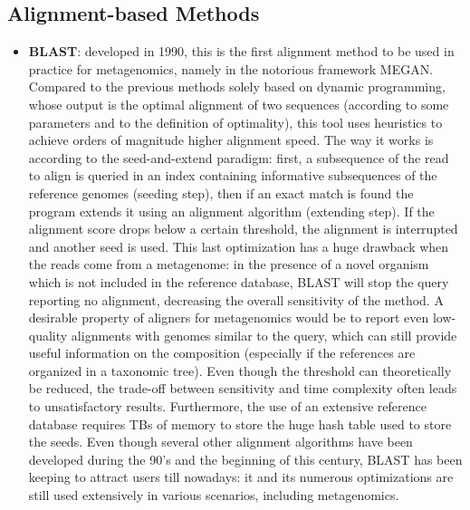\subsection{Alignment-based Methods}
\begin{itemize}
    \item \textbf{BLAST}: developed in 1990, this is the first alignment method to be used in practice for metagenomics, namely in the notorious framework MEGAN. Compared to the previous methods solely based on dynamic programming, whose output is the optimal alignment of two sequences (according to some parameters and to the definition of optimality), this tool uses heuristics to achieve orders of magnitude higher alignment speed. The way it works is according to the seed-and-extend paradigm: first, a subsequence of the read to align is queried in an index containing informative subsequences of the reference genomes (seeding step), then if an exact match is found the program extends it using an alignment algorithm (extending step). If the alignment score drops below a certain threshold, the alignment is interrupted and another seed is used. This last optimization has a huge drawback when the reads come from a metagenome: in the presence of a novel organism which is not included in the reference database, BLAST will stop the query reporting no alignment, decreasing the overall sensitivity of the method. A desirable property of aligners for metagenomics would be to report even low-quality alignments with genomes similar to the query, which can still provide useful information on the composition (especially if the references are organized in a taxonomic tree). Even though the threshold can theoretically be reduced, the trade-off between sensitivity and time complexity often leads to unsatisfactory results. Furthermore, the use of an extensive reference database requires TBs of memory to store the huge hash table used to store the seeds. Even though several other alignment algorithms have been developed during the 90's and the beginning of this century, BLAST has been keeping to attract users till nowadays: it and its numerous optimizations are still used extensively in various scenarios, including metagenomics.

\end{itemize}
